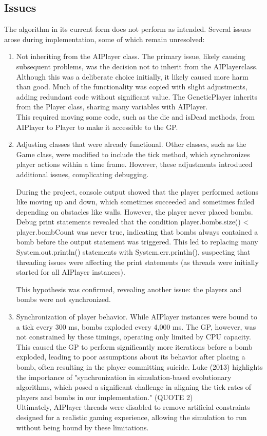 \documentclass[sigconf]{acmart} %
\begin{document}
\subsection{Issues}
The algorithm in its current form does not perform as intended. Several issues arose during implementation, some of which remain unresolved: 
\begin{enumerate}
      \item Not inheriting from the AIPlayer class. 
      The primary issue, likely causing subsequent problems, was the decision not to inherit from the AIPlayerclass. Although this was a deliberate choice initially, it likely caused more harm than good. Much of the functionality was copied with slight adjustments, adding redundant code without significant value. The GeneticPlayer inherits from the Player class, sharing many variables with AIPlayer. \\ 
This required moving some code, such as the die and isDead methods, from AIPlayer to Player to make it accessible to the GP.
      \item Adjusting classes that were already functional. 
      Other classes, such as the Game class, were modified to include the tick method, which synchronizes player actions within a time frame. However, these adjustments introduced additional issues, complicating debugging. 
	  
	During the project, console output showed that the player performed actions like moving up and down, which sometimes succeeded and sometimes failed depending on obstacles like walls. However, the player never placed bombs. Debug print statements revealed that the condition player.bombs.size() < player.bombCount was never true, indicating that bombs always contained a bomb before the output statement was triggered. This led to replacing many System.out.println() statements with System.err.println(), suspecting that threading issues were affecting the print statements (as threads were initially started for all AIPlayer instances). 
 
 This hypothesis was confirmed, revealing another issue: the players and bombs were not synchronized.
      \item Synchronization of player behavior. 
      While AIPlayer instances were bound to a tick every 300 ms, bombs exploded every 4,000 ms. The GP, however, was not constrained by these timings, operating only limited by CPU capacity. This caused the GP to perform significantly more iterations before a bomb exploded, leading to poor assumptions about its behavior after placing a bomb, often resulting in the player committing suicide. Luke (2013) highlights the importance of \cite{Luke2013Metaheuristics} "synchronization in simulation-based evolutionary algorithms, which posed a significant challenge in aligning the tick rates of players and bombs in our implementation." (QUOTE 2)\\ 
	  Ultimately, AIPlayer threads were disabled to remove artificial constraints designed for a realistic gaming experience, allowing the simulation to run without being bound by these limitations. 
   

\end{enumerate}
\end{document}
